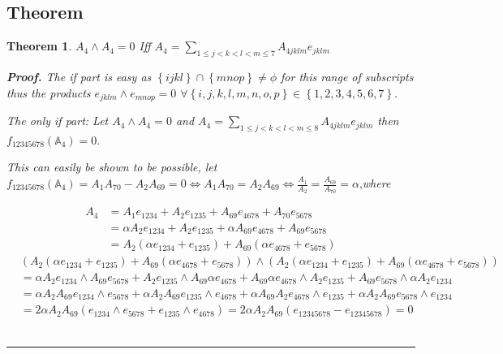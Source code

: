 \documentclass[aps, preprint]{revtex4}
\newtheorem{theorem}{Theorem}
\newenvironment{proof}[1][Proof]{\noindent\textbf{#1.} }{\ \rule{0.5em}{0.5em}}
\begin{document}
\subsection{Theorem}
\begin{theorem}
$A_{4} \wedge A_{4} =0$ Iff $A_{4} ={\displaystyle\sum _{1 \leq j <k <l <m \leq 7}}A_{4 j k l m} e_{j k l m}$ 


\begin{proof}
The if part is easy as $\left \{i j k l\right \} \cap \left \{m n o p\right \} \neq \phi $ for this range of subscripts thus the products $e_{j k l m} \wedge e_{m n o p} =0$ $ \forall \left \{i ,j ,k ,l ,m ,n ,o ,p\right \} \in \left \{1 ,2 ,3 ,4 ,5 ,6 ,7\right \}\text{.}$ 

The only if part: Let $A_{4} \wedge A_{4} =0$ and $A_{4} ={\displaystyle\sum _{1 \leq j <k <l <m \leq 8}}A_{4 j k l m} e_{j k l m}$ then $f_{1 2 3 4 5 6 7 8} \left (\mathbb{A}_{4}\right ) =0.$ 

This can easily be shown to be possible, let $f_{1 2 3 4 5 6 7 8} \left (\mathbb{A}_{4}\right ) =A_{1} A_{7 0} -A_{2} A_{6 9} =0 \Leftrightarrow A_{1} A_{7 0} =A_{2} A_{6 9} \Leftrightarrow \frac{A_{1}}{A_{2}} =\frac{A_{6 9}}{A_{7 0}} =\alpha \text{,}$where 


\begin{align}A_{4} &  =A_{1} e_{1 2 3 4} +A_{2} e_{1 2 3 5} +A_{6 9} e_{4 6 7 8} +A_{7 0} e_{5 6 7 8} \\
 &  =\alpha  A_{2} e_{1 2 3 4} +A_{2} e_{1 2 3 5} +\alpha  A_{6 9} e_{4 6 7 8} +A_{6 9} e_{5 6 7 8} \\
 &  =A_{2} \left (\alpha  e_{1 2 3 4} +e_{1 2 3 5}\right ) +A_{6 9} \left (\alpha  e_{4 6 7 8} +e_{5 6 7 8}\right )\end{align}
\begin{align} & \left (\overset{}{} A_{2} \left (\alpha  e_{1 2 3 4} +e_{1 2 3 5}\right ) +A_{6 9} \left (\alpha  e_{4 6 7 8} +e_{5 6 7 8}\right )\right ) \wedge \left (\overset{}{} A_{2} \left (\alpha  e_{1 2 3 4} +e_{1 2 3 5}\right ) +A_{6 9} \left (\alpha  e_{4 6 7 8} +e_{5 6 7 8}\right )\right ) \\
 &  =\alpha  A_{2} e_{1 2 3 4} \wedge A_{6 9} e_{5 6 7 8} +A_{2} e_{1 2 3 5} \wedge A_{6 9} \alpha  e_{4 6 7 8} +A_{6 9} \alpha  e_{4 6 7 8} \wedge A_{2} e_{1 2 3 5} +A_{6 9} e_{5 6 7 8} \wedge \alpha  A_{2} e_{1 2 3 4} \\
 &  =\alpha  A_{2} A_{6 9} e_{1 2 3 4} \wedge e_{5 6 7 8} +\alpha  A_{2} A_{6 9} e_{1 2 3 5} \wedge e_{4 6 7 8} +\alpha  A_{6 9} A_{2} e_{4 6 7 8} \wedge e_{1 2 3 5} +\alpha  A_{2} A_{6 9} e_{5 6 7 8} \wedge e_{1 2 3 4} \\
 &  =2 \alpha  A_{2} A_{6 9} \left (e_{1 2 3 4} \wedge e_{5 6 7 8} +e_{1 2 3 5} \wedge e_{4 6 7 8}\right ) =2 \alpha  A_{2} A_{6 9} \left (e_{1 2 3 4 5 6 7 8} -e_{1 2 3 4 5 6 7 8}\right ) =0\end{align}
\end{proof}


\end{theorem}
\end{document}
